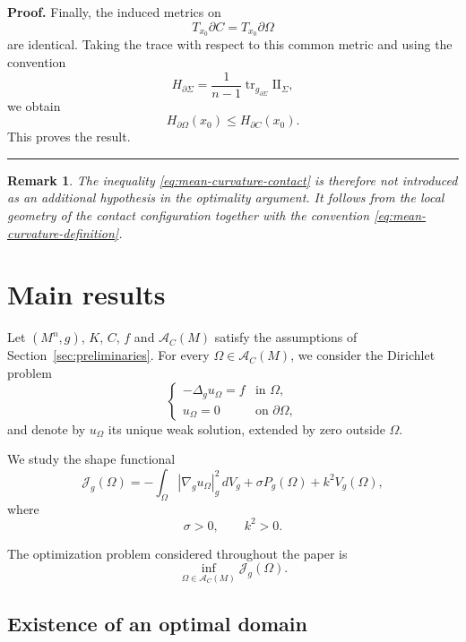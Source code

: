 \documentclass{article}
\renewcommand{\boxed}[1]{#1}
\newtheorem{remark}[theorem]{Remark}
\newenvironment{proof}[1][Proof]{\textbf{#1.} }{\ \rule{0.5em}{0.5em}}
\begin{document}
\begin{proof}
Finally, the induced metrics on
\[
T_{x_0}\partial C
=
T_{x_0}\partial\Omega
\]
are identical. Taking the trace with respect to this common metric
and using the convention
\[
H_{\partial\Sigma}
=
\frac{1}{n-1}
\operatorname{tr}_{g_{\partial\Sigma}}
\mathrm{II}_{\Sigma},
\]
we obtain
\[
H_{\partial\Omega}(x_0)
\leq
H_{\partial C}(x_0).
\]
This proves the result.
\end{proof}
\begin{remark}
The inequality \eqref{eq:mean-curvature-contact} is therefore not
introduced as an additional hypothesis in the optimality argument. It
follows from the local geometry of the contact configuration together
with the convention \eqref{eq:mean-curvature-definition}.
\end{remark}
\section{Main results}
\label{sec:main-results}

Let $(M^n,g)$, $K$, $C$, $f$ and $\mathcal A_C(M)$ satisfy the
assumptions of Section~\ref{sec:preliminaries}. For every
$\Omega\in\mathcal A_C(M)$, we consider the Dirichlet problem
\begin{equation}
\begin{cases}
-\Delta_g u_\Omega=f & \text{in }\Omega,\\
u_\Omega=0 & \text{on }\partial\Omega,
\end{cases}
\label{eq:state-main}
\end{equation}
and denote by $u_\Omega$ its unique weak solution, extended by zero
outside $\Omega$.

We study the shape functional
\begin{equation}
\mathcal J_g(\Omega)
=
-\int_\Omega |\nabla_g u_\Omega|_g^2\,dV_g
+\sigma P_g(\Omega)
+k^2V_g(\Omega),
\label{eq:Jg-main}
\end{equation}
where
\[
\sigma>0,
\qquad
k^2>0.
\]

The optimization problem considered throughout the paper is
\begin{equation}
\boxed{
\inf_{\Omega\in\mathcal A_C(M)}
\mathcal J_g(\Omega).
}
\label{eq:optimization-problem}
\end{equation}

\subsection{Existence of an optimal domain}
\label{subsec:existence}
\end{document}
